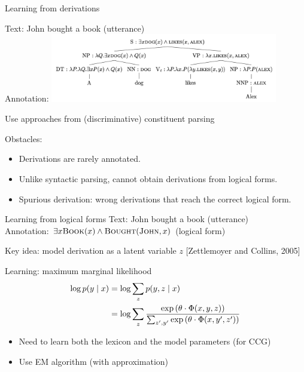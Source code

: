 \documentclass[usenames,dvipsnames,notes,11pt,aspectratio=169]{beamer}
\begin{document}
\begin{frame}
    {Learning from derivations}

    Text: John bought a book (utterance)\\
    Annotation: 
    \includegraphics[height=3cm]{figures/derivation}

    Use approaches from (discriminative) constituent parsing

    \pause
    Obstacles:\\
    \begin{itemize}
        \item Derivations are rarely annotated.
        \item Unlike syntactic parsing, cannot obtain derivations from logical forms.
        \item Spurious derivation: wrong derivations that reach the correct logical form.
    \end{itemize}
\end{frame}

\begin{frame}
    {Learning from logical forms}
    Text: John bought a book (utterance)\\
    Annotation: $\exists x \textsc{Book}(x) \land \textsc{Bought}(\textsc{John}, x)$ (logical form)

    {Key idea}: model derivation as a latent variable $z$ [Zettlemoyer and Collins, 2005]

    Learning: maximum marginal likelihood
    \begin{align*}
        \log p(y\mid x) &= \log\sum_z p(y,z\mid x) \\
        &= \log\sum_z \frac{\exp\left( \theta\cdot\Phi(x,y,z) \right)}
        {\sum_{z',y'} \exp\left( \theta\cdot\Phi(x,y',z') \right)}
    \end{align*}
    
    \begin{itemize}
        \item Need to learn both the lexicon and the model parameters (for CCG)
        \item Use EM algorithm (with approximation)
    \end{itemize}
\end{frame}
\end{document}
